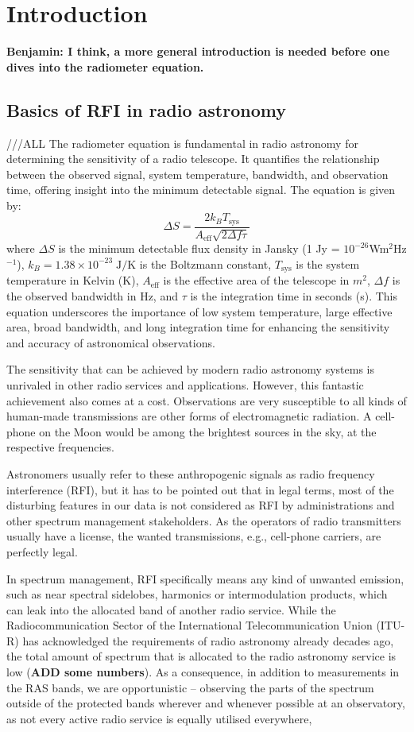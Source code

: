 \section{Introduction}
\label{section:hardware:introduction}

\textbf{Benjamin: I think, a more general introduction is needed before one dives into the radiometer equation.}

\subsection{Basics of RFI in radio astronomy} ///ALL
The radiometer equation is fundamental in radio astronomy for determining the sensitivity of a radio telescope. It quantifies the relationship between the observed signal, system temperature, bandwidth, and observation time, offering insight into the minimum detectable signal. The equation is given by:
\[ \Delta S = \frac{2 k_B T_{\text{sys}}}{A_{\text{eff}} \sqrt{2 \Delta f \tau}} \]
where \( \Delta S \) is the minimum detectable flux density in Jansky (1 Jy = $10^{-26}$Wm$^2$Hz$^{-1}$), \( k_B =1.38 \times 10^{-23} \;\text{J} / \text{K}\) is the Boltzmann constant, \( T_{\text{sys}} \) is the system temperature in Kelvin (K), \( A_{\text{eff}} \) is the effective area of the telescope in $m^2$, \( \Delta f \) is the observed bandwidth in Hz, and \( \tau \) is the integration time in seconds (s). This equation underscores the importance of low system temperature, large effective area, broad bandwidth, and long integration time for enhancing the sensitivity and accuracy of astronomical observations.

The sensitivity that can be achieved by modern radio astronomy systems is unrivaled in other radio services and applications. However, this fantastic achievement also comes at a cost. Observations are very susceptible to all kinds of human-made transmissions are other forms of electromagnetic radiation. A cell-phone on the Moon would be among the brightest sources in the sky, at the respective frequencies. 

Astronomers usually refer to these anthropogenic signals as radio frequency interference (RFI), but it has to be pointed out that in legal terms, most of the disturbing features in our data is not considered as RFI by administrations and other spectrum management stakeholders. As the operators of radio transmitters usually have a license, the wanted transmissions, e.g., cell-phone carriers, are perfectly legal. 

In spectrum management, RFI specifically means any kind of unwanted emission, such as near spectral sidelobes, harmonics or intermodulation products, which can leak into the allocated band of another radio service. While the Radiocommunication Sector of the International Telecommunication Union (ITU-R) has acknowledged the requirements of radio astronomy already decades ago, the total amount of spectrum that is allocated to the radio astronomy service is low (\textbf{ADD some numbers}). As a consequence, in addition to measurements in the RAS bands, we are opportunistic -- observing the parts of the spectrum outside of the protected bands wherever and whenever possible at an observatory, as not every active radio service is equally utilised everywhere, 

